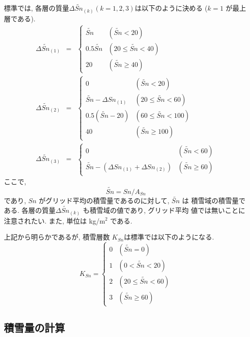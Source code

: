 標準では, 各層の質量$\Delta \widetilde{Sn}_{(k)} (k=1,2,3)$は以下のように決める
($k=1$ が最上層である). 
\begin{eqnarray}
 \Delta \widetilde{Sn}_{(1)} &=& \left\{
\begin{array}{ll}
 \widetilde{Sn} & (\widetilde{Sn} < 20) \\
 0.5\widetilde{Sn} & (20 \leq \widetilde{Sn} < 40)\\
 20 & (\widetilde{Sn} \geq 40)
\end{array}
\right. \label{snow_cut1}\\
 \Delta \widetilde{Sn}_{(2)} &=& \left\{
\begin{array}{ll}
 0 & (\widetilde{Sn} < 20) \\
 \widetilde{Sn} - \Delta Sn_{(1)} & (20 \leq \widetilde{Sn} < 60)\\
 0.5(\widetilde{Sn}-20) & (60 \leq \widetilde{Sn} < 100)\\
 40 & (\widetilde{Sn} \geq 100)
\end{array}
\right. \label{snow_cut2}\\
 \Delta \widetilde{Sn}_{(3)} &=& \left\{
\begin{array}{ll}
 0 & (\widetilde{Sn} < 60) \\
 \widetilde{Sn} - (\Delta Sn_{(1)} + \Delta Sn_{(2)})& (\widetilde{Sn} \geq 60)
\end{array}
\right. \label{snow_cut3}
\end{eqnarray}
ここで, 
\begin{equation}
 \widetilde{Sn} =  Sn / A_{Sn}
\end{equation}
であり, $Sn$ がグリッド平均の積雪量であるのに対して, $\widetilde{Sn}$ は
積雪域の積雪量である. 
各層の質量$\Delta \widetilde{Sn}_{(k)}$ も積雪域の値であり, グリッド平均
値では無いことに注意されたい. 
また, 単位は kg/m$^2$ である. 

上記から明らかであるが, 積雪層数 $K_{Sn}$は標準では以下のようになる. 
\begin{equation}
 K_{Sn} = \left\{
\begin{array}{ll}
 0 & (\widetilde{Sn} = 0)\\
 1 & (0< \widetilde{Sn} < 20)\\
 2 & (20 \leq \widetilde{Sn} < 60)\\
 3 & (\widetilde{Sn} \geq 60)
\end{array}
\right.
\end{equation}

\subsection{積雪量の計算}

